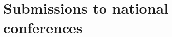 \section*{Submissions to national conferences}
\begin{refsection}
\nocite{adina_s_wagner_2021_4541323}

\begin{refcontext}[sorting=nyt]  
	\printbibliography[heading=none, resetnumbers=true]
\end{refcontext}
\end{refsection}
%
